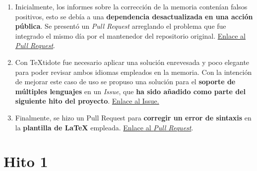 \begin{enumerate}
	\item{Inicialmente, los informes sobre la corrección de la memoria contenían falsos positivos, esto se debía a una \textbf{dependencia desactualizada en una acción pública}. Se presentó un \textit{Pull Request} arreglando el problema que fue integrado el mismo día por el mantenedor del repositorio original. \href{https://github.com/ChiefGokhlayeh/textidote-action/pull/33}{Enlace al \textit{Pull Request}}.}
	
	\item{Con TeXtidote fue necesario aplicar una solución enrevesada y poco elegante para poder revisar ambos idiomas empleados en la memoria. Con la intención de mejorar este caso de uso se propuso una solución para el \textbf{soporte de múltiples lenguajes} en un \textit{Issue}, que \textbf{ha sido añadido como parte del siguiente hito del proyecto}. \href{https://github.com/sylvainhalle/textidote/issues/203}{Enlace al Issue.}}
	
	\item{Finalmente, se hizo un Pull Request para \textbf{corregir un error de sintaxis} en la \textbf{plantilla de LaTeX} empleada. \href{https://github.com/JJ/plantilla-TFG-ETSIIT/pull/7}{Enlace al \textit{Pull Request}}.}
\end{enumerate}

\section{Hito 1}